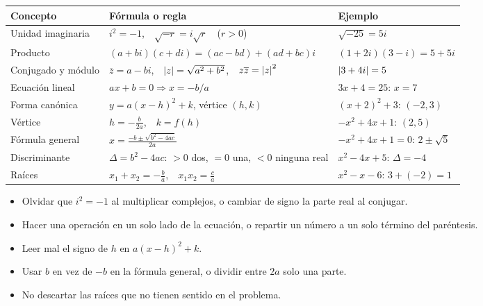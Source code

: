 \documentclass[11pt,a4paper]{article}
\newcommand{\conj}[1]{\overline{#1}}
\begin{document}
\repaso
\begin{center}
\begin{tabularx}{\linewidth}{@{}l L l@{}}
\toprule
Concepto & Fórmula o regla & Ejemplo\\ \midrule
Unidad imaginaria & $i^2=-1$,\ \ $\sqrt{-r}=i\sqrt r$\ \ ($r>0$) & $\sqrt{-25}=5i$\\
Producto & $(a+bi)(c+di)=(ac-bd)+(ad+bc)i$ & $(1+2i)(3-i)=5+5i$\\
Conjugado y módulo & $\conj z=a-bi$,\ \ $\left\lvert z\right\rvert=\sqrt{a^2+b^2}$,\ \ $z\conj z=\abs z^2$ & $\left\lvert 3+4i\right\rvert=5$\\
Ecuación lineal & $ax+b=0\Rightarrow x=-b/a$ & $3x+4=25$: $x=7$\\
Forma canónica & $y=a(x-h)^2+k$, vértice $(h,k)$ & $(x+2)^2+3$: $(-2,3)$\\
Vértice & $h=-\frac{b}{2a}$,\ \ $k=f(h)$ & $-x^2+4x+1$: $(2,5)$\\
Fórmula general & $x=\frac{-b\pm\sqrt{b^2-4ac}}{2a}$ & $-x^2+4x+1=0$: $2\pm\sqrt5$\\
Discriminante & $\Delta=b^2-4ac$: $>0$ dos, $=0$ una, $<0$ ninguna real & $x^2-4x+5$: $\Delta=-4$\\
Raíces & $x_1+x_2=-\frac ba$,\ \ $x_1x_2=\frac ca$ & $x^2-x-6$: $3+(-2)=1$\\
\bottomrule
\end{tabularx}
\end{center}

\begin{ojo}
\begin{itemize}
\item Olvidar que $i^2=-1$ al multiplicar complejos, o cambiar de signo la parte real al conjugar.
\item Hacer una operación en un solo lado de la ecuación, o repartir un número a un solo término del paréntesis.
\item Leer mal el signo de $h$ en $a(x-h)^2+k$.
\item Usar $b$ en vez de $-b$ en la fórmula general, o dividir entre $2a$ solo una parte.
\item No descartar las raíces que no tienen sentido en el problema.
\end{itemize}
\end{ojo}
\end{document}
